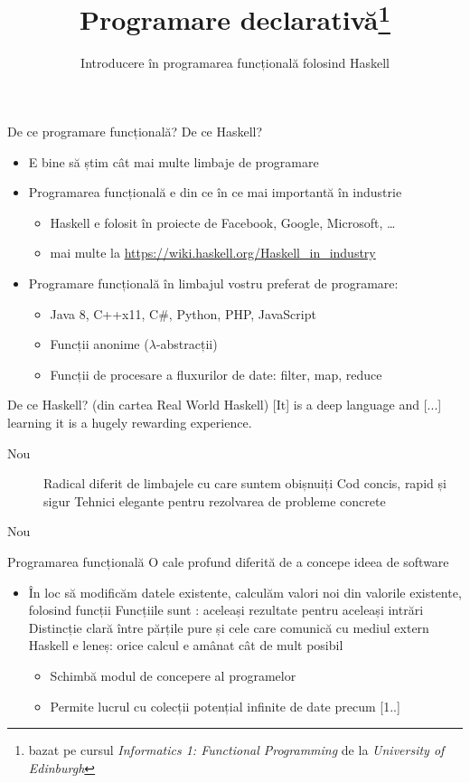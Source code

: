 \documentclass[handout,xcolor=pdftex,romanian,colorlinks]{beamer}
\title[PD---Introducere]{Programare declarativă\thanks{bazat pe cursul \emph{Informatics 1: Functional Programming} de la \emph{University of Edinburgh}}}
\subtitle{Introducere în programarea funcțională folosind Haskell}
\begin{document}
\begin{frame}
  \titlepage
\end{frame}

\begin{frame}{De ce programare funcțională? De ce Haskell?}
\begin{itemize}
\item E bine să știm cât mai multe limbaje de programare
\item Programarea funcțională e din ce în ce mai importantă în industrie
\begin{itemize}
\item Haskell e folosit în proiecte de Facebook, Google, Microsoft, \ldots
\item mai multe la \url{https://wiki.haskell.org/Haskell_in_industry}
\end{itemize} 
\item Programare funcțională în limbajul vostru preferat de programare:

\begin{itemize}
\item  Java 8, C++x11, C\#, Python, PHP, JavaScript 
\item Funcții anonime ($\lambda$-abstracții)
\item Funcții de procesare a fluxurilor de date: filter, map, reduce
\end{itemize}
\end{itemize}

\begin{block}{De ce Haskell? (din cartea Real World Haskell)}
 [It] is a deep language and [...] learning it is a hugely rewarding experience.
\end{block}
\begin{description}
\item[Nou] Radical diferit de limbajele cu care suntem obișnuiți
\vitem[Puternic] Cod concis, rapid și sigur
\vitem[Plăcut] Tehnici elegante pentru rezolvarea de probleme concrete
\end{description}
\end{frame}

\begin{frame}{Nou}
\begin{block}{Programarea funcțională}
O cale profund diferită de a concepe ideea de software
\end{block}
\begin{itemize}
\item În loc să modificăm datele existente, calculăm valori noi din valorile existente, folosind funcții
\vitem Funcțiile sunt : aceleași rezultate pentru aceleași intrări
\vitem Distincție clară între părțile pure și cele care comunică cu mediul extern
\vitem Haskell e leneș: orice calcul e amânat cât de mult posibil
\begin{itemize}
\item Schimbă modul de concepere al programelor
\item Permite lucrul cu colecții potențial infinite de date precum [1..]
\end{itemize}
\end{itemize}
\end{frame}
\end{document}
